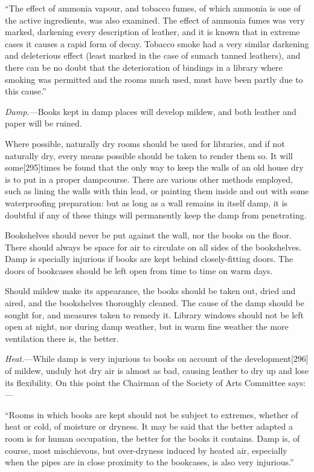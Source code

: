 \documentclass[
]{article}
\begin{document}
``The effect of ammonia vapour, and tobacco fumes, of which ammonia is
one of the active ingredients, was also examined. The effect of ammonia
fumes was very marked, darkening every description of leather, and it is
known that in extreme cases it causes a rapid form of decay. Tobacco
smoke had a very similar darkening and deleterious effect (least marked
in the case of sumach tanned leathers), and there can be no doubt that
the deterioration of bindings in a library where smoking was permitted
and the rooms much used, must have been partly due to this cause.''

\emph{Damp.}---Books kept in damp places will develop mildew, and both
leather and paper will be ruined.

Where possible, naturally dry rooms should be used for libraries, and if
not naturally dry, every means possible should be taken to render them
so. It will some{\protect\hypertarget{Page_295}{}{{[}295{]}}}times be
found that the only way to keep the walls of an old house dry is to put
in a proper dampcourse. There are various other methods employed, such
as lining the walls with thin lead, or painting them inside and out with
some waterproofing preparation: but as long as a wall remains in itself
damp, it is doubtful if any of these things will permanently keep the
damp from penetrating.

Bookshelves should never be put against the wall, nor the books on the
floor. There should always be space for air to circulate on all sides of
the bookshelves. Damp is specially injurious if books are kept behind
closely-fitting doors. The doors of bookcases should be left open from
time to time on warm days.

Should mildew make its appearance, the books should be taken out, dried
and aired, and the bookshelves thoroughly cleaned. The cause of the damp
should be sought for, and measures taken to remedy it. Library windows
should not be left open at night, nor during damp weather, but in warm
fine weather the more ventilation there is, the better.

\emph{Heat.}---While damp is very injurious to books on account of the
development{\protect\hypertarget{Page_296}{}{{[}296{]}}} of mildew,
unduly hot dry air is almost as bad, causing leather to dry up and lose
its flexibility. On this point the Chairman of the Society of Arts
Committee says:---

``Rooms in which books are kept should not be subject to extremes,
whether of heat or cold, of moisture or dryness. It may be said that the
better adapted a room is for human occupation, the better for the books
it contains. Damp is, of course, most mischievous, but over-dryness
induced by heated air, especially when the pipes are in close proximity
to the bookcases, is also very injurious.''
\end{document}

